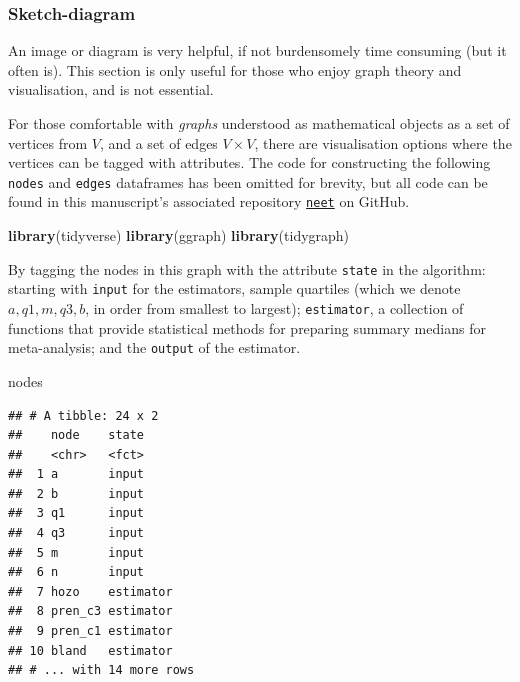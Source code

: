 \documentclass[
]{article}
\newenvironment{Shaded}{\begin{snugshade}}{\end{snugshade}}
\newcommand{\KeywordTok}[1]{\textcolor[rgb]{0.13,0.29,0.53}{\textbf{#1}}}
\newcommand{\NormalTok}[1]{#1}
\begin{document}
\hypertarget{sketch-diagram}{%
\subsubsection{Sketch-diagram}\label{sketch-diagram}}

An image or diagram is very helpful, if not burdensomely time consuming (but it often is). This section is only useful for those who enjoy graph theory and visualisation, and is not essential.

For those comfortable with \emph{graphs} understood as mathematical objects as a set of vertices from \(V\), and a set of edges \(V \times V\), there are visualisation options where the vertices can be tagged with attributes. The code for constructing the following \texttt{nodes} and \texttt{edges} dataframes has been omitted for brevity, but all code can be found in this manuscript's associated repository \href{https://github.com/softloud/neet}{\texttt{neet}} on GitHub.

\begin{Shaded}
\begin{Highlighting}[]
\KeywordTok{library}\NormalTok{(tidyverse)}
\KeywordTok{library}\NormalTok{(ggraph)}
\KeywordTok{library}\NormalTok{(tidygraph)}
\end{Highlighting}
\end{Shaded}

By tagging the nodes in this graph with the attribute \texttt{state} in the algorithm: starting with \texttt{input} for the estimators, sample quartiles (which we denote \(a, q1, m, q3, b\), in order from smallest to largest); \texttt{estimator}, a collection of functions that provide statistical methods for preparing summary medians for meta-analysis; and the \texttt{output} of the estimator.

\begin{Shaded}
\begin{Highlighting}[]
\NormalTok{nodes}
\end{Highlighting}
\end{Shaded}

\begin{verbatim}
## # A tibble: 24 x 2
##    node    state    
##    <chr>   <fct>    
##  1 a       input    
##  2 b       input    
##  3 q1      input    
##  4 q3      input    
##  5 m       input    
##  6 n       input    
##  7 hozo    estimator
##  8 pren_c3 estimator
##  9 pren_c1 estimator
## 10 bland   estimator
## # ... with 14 more rows
\end{verbatim}
\end{document}
